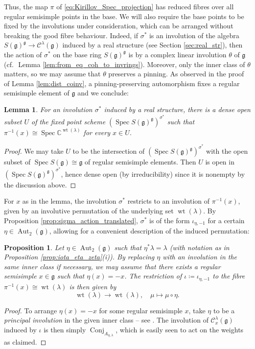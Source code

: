 \documentclass{amsart}
\newcommand{\cf}{cf.\,}
\newcommand{\Aut}{\operatorname{Aut}}
\newcommand{\C}{\mathbb{C}}
\newcommand{\Conj}{\operatorname{Conj}}
\newcommand{\Kir}{\mathcal{C}}
\newcommand{\g}{\mathfrak{g}}
\newcommand{\Spec}{\operatorname{Spec}}
\newcommand{\wt}{\operatorname{wt}}
\newcommand{\inv}{^{-1}}
\theoremstyle{definition}
\theoremstyle{plain}
\newtheorem{prop}[defn]{Proposition}
\newtheorem{lem}[defn]{Lemma}
\theoremstyle{remark}
\begin{document}
Thus, the map $\pi$ of \eqref{eq:Kirillov_Spec_projection} has reduced fibres over all regular semisimple points in the base. We will also require the base points to be fixed by the involutions under consideration, which can be arranged without breaking the good fibre behaviour. Indeed, if $\sigma^*$ is an involution of the algebra $S(\g)^\g\to \Kir^\lambda(\g)$ induced by a real structure (see Section \ref{sec:real_str}), then the action of $\sigma^*$ on the base ring $S(\g)^\g$ is by a complex linear involution $\theta$ of $\g$ (\cf\ Lemma \ref{lem:from_eq_coh_to_invrings}). Moreover, only the inner class of $\theta$ matters, so we may assume that $\theta$ preserves a pinning. As observed in the proof of Lemma \ref{lem:dist_coinv}, a pinning-preserving automorphism fixes a regular semisimple element of $\g$ and we conclude:
\begin{lem}
\label{lem:good_base_points}
    For an involution $\sigma^*$ induced by a real structure, there is a dense open subset $U$ of the fixed point scheme $(\Spec S(\g)^\g)^{\sigma^*}$ such that $\pi\inv (x) \cong \Spec \C^{\wt(\lambda)}$ for every $x\in U$.
\end{lem}
\begin{proof}
    We may take $U$ to be the intersection of $(\Spec S(\g)^\g)^{\sigma^*}$ with the open subset of $\Spec S(\g) \cong \g$ of regular semisimple elements. Then $U$ is open in $(\Spec S(\g)^\g)^{\sigma^*}$, hence dense open (by irreducibility) since it is nonempty by the discussion above.
\end{proof}

For $x$ as in the lemma, the involution $\sigma^*$ restricts to an involution of $\pi\inv (x)$, given by an involutive permutation of the underlying set $\wt(\lambda)$. By Proposition \ref{prop:sigma_action_translated}, $\sigma^*$ is of the form $\iota_{\eta, -1}$ for a certain $\eta\in \Aut_2(\g)$, allowing for a convenient description of the induced permutation:
\begin{prop}
\label{prop:involution_to_wt_permutation}
    Let $\eta\in \Aut_2(\g)$ such that $\eta^*\lambda = \lambda$ (with notation as in Proposition \ref{prop:iota_eta_zeta}(i)). By replacing $\eta$ with an involution in the same inner class if necessary, we may assume that there exists a regular semisimple $x\in \g$ such that $\eta(x) = -x$. The restriction of $\iota \coloneqq \iota_{\eta, -1}$ to the fibre $\pi\inv(x) \cong \wt (\lambda)$ is then given by
    $$
        \wt(\lambda)\to \wt(\lambda),
        \quad
        \mu \mapsto \mu \circ \eta.
    $$
\end{prop}
\begin{proof}
    To arrange $\eta(x) = - x$ for some regular semisimple $x$, take $\eta$ to be a \emph{principal involution} in the given inner class -- see \cite[Def.\,6.13 and Thm.\,6.14]{AV1992_projective}. The involution of $\Kir^\lambda_x(\g)$ induced by $\iota$ is then simply $\Conj_{A_{\eta,\lambda}}$, which is easily seen to act on the weights as claimed.
\end{proof}
\end{document}
